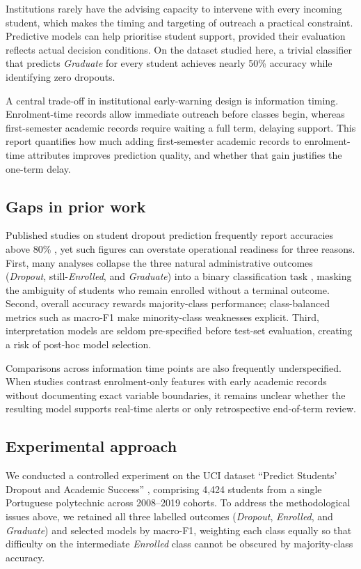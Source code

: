 \documentclass[11pt,a4paper]{article}
\newcommand{\Dropout}{\textit{Dropout}}
\newcommand{\Enrolled}{\textit{Enrolled}}
\newcommand{\Graduate}{\textit{Graduate}}
\begin{document}
Institutions rarely have the advising capacity to intervene with every incoming student, which makes
the timing and targeting of outreach a practical constraint. Predictive models can help prioritise
student support, provided their evaluation reflects actual decision conditions. On the dataset
studied here, a trivial classifier that predicts \Graduate{} for every student achieves nearly 50\%
accuracy while identifying zero dropouts.

A central trade-off in institutional early-warning design is information timing. Enrolment-time
records allow immediate outreach before classes begin, whereas first-semester academic records
require waiting a full term, delaying support. This report quantifies how much adding first-semester
academic records to enrolment-time attributes improves prediction quality, and whether that gain
justifies the one-term delay.

\subsection{Gaps in prior work}

Published studies on student dropout prediction frequently report accuracies above 80\%
\citep{berens2019,aulck2016}, yet such figures can overstate operational readiness for three
reasons. First, many analyses collapse the three natural administrative outcomes (\Dropout{},
still-\Enrolled{}, and \Graduate{}) into a binary classification task \citep{marbouti2016}, masking
the ambiguity of students who remain enrolled without a terminal outcome. Second, overall accuracy
rewards majority-class performance; class-balanced metrics such as macro-F1 \citep{sokolova2009}
make minority-class weaknesses explicit. Third, interpretation models are seldom pre-specified
before test-set evaluation, creating a risk of post-hoc model selection.

Comparisons across information time points are also frequently underspecified. When studies contrast
enrolment-only features with early academic records without documenting exact variable boundaries,
it remains unclear whether the resulting model supports real-time alerts or only retrospective
end-of-term review.

\subsection{Experimental approach}

We conducted a controlled experiment on the UCI dataset ``Predict Students' Dropout and Academic
Success'' \citep{realinho2021}, comprising 4,424 students from a single Portuguese polytechnic
across 2008--2019 cohorts. To address the methodological issues above, we retained all three
labelled outcomes (\Dropout{}, \Enrolled{}, and \Graduate{}) and selected models by macro-F1,
weighting each class equally so that difficulty on the intermediate \Enrolled{} class cannot be
obscured by majority-class accuracy.
\end{document}
